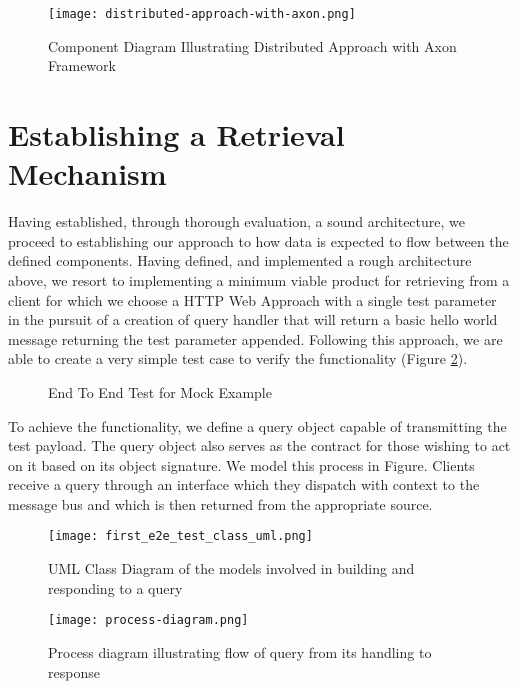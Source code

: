 \begin{figure}[h!]
	\centering
	\texttt{[image: distributed-approach-with-axon.png]}
	\caption{Component Diagram Illustrating Distributed Approach with Axon Framework}
	\label{fig:distributed-approach}
\end{figure}

\section{Establishing a Retrieval Mechanism}

Having established, through thorough evaluation, a sound architecture, we proceed to establishing our approach to how data is expected to flow between the defined components. Having defined, and implemented a rough architecture above, we resort to implementing a minimum viable product for retrieving from a client for which we choose a HTTP Web Approach with a single test parameter in the pursuit of a creation of query handler that will return a basic hello world message returning the test parameter appended. Following this approach, we are able to create a very simple test case to verify the functionality (Figure \ref{fig:e2eMockTest}).

\begin{figure}[h!]
		\centering
		
		\caption{End To End Test for Mock Example}
		\label{fig:e2eMockTest}
\end{figure}

To achieve the functionality, we define a query object capable of transmitting the test payload. The query object also serves as the contract for those wishing to act on it based on its object signature. We model this process in Figure. Clients receive a query through an interface which they dispatch with context to the message bus and which is then returned from the appropriate source. 

\begin{figure}[h!]
	\centering
	\texttt{[image: first\_e2e\_test\_class\_uml.png]}
	\caption{UML Class Diagram of the models involved in building and responding to a query}
	\label{fig:firste2etestclassuml}
\end{figure}

\begin{figure}[h!]
	\centering
	\texttt{[image: process-diagram.png]}
	\caption{Process diagram illustrating flow of query from its handling to response}
	\label{fig:processSequenceQueryFlow}
\end{figure}

